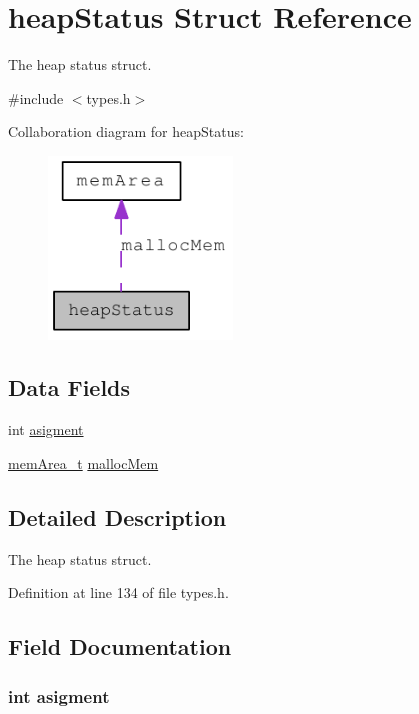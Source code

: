 \hypertarget{structheap_status}{
\section{heapStatus Struct Reference}
\label{structheap_status}
}


The heap status struct.  




{\ttfamily \#include $<$types.h$>$}



Collaboration diagram for heapStatus:\nopagebreak
\begin{figure}[H]
\begin{center}
\leavevmode
\includegraphics[width=139pt]{structheap_status__coll__graph}
\end{center}
\end{figure}
\subsection*{Data Fields}
\begin{DoxyCompactItemize}
\item 
int \hyperlink{structheap_status_aa6ddfc2b6fa7dd2f05f6226e7d41d3a2}{asigment}
\item 
\hyperlink{structmem_area__t}{memArea\_\-t} \hyperlink{structheap_status_a563eaaea14f23514bd4a6c87f11711dd}{mallocMem}
\end{DoxyCompactItemize}


\subsection{Detailed Description}
The heap status struct. 

Definition at line 134 of file types.h.



\subsection{Field Documentation}
\hypertarget{structheap_status_aa6ddfc2b6fa7dd2f05f6226e7d41d3a2}{
\subsubsection[{asigment}]{\setlength{\rightskip}{0pt plus 5cm}int {\bf asigment}}}
\label{structheap_status_aa6ddfc2b6fa7dd2f05f6226e7d41d3a2}


